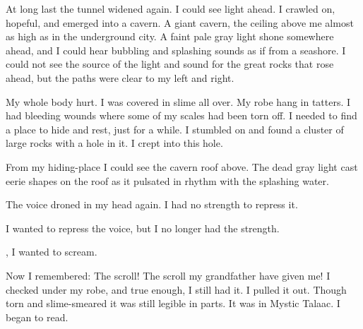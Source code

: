 \documentclass
  [a4paper,
   12pt,
   oneside
  ]%
  {article}
\begin{document}



At long last the tunnel widened again. 
I could see light ahead. 
I crawled on, hopeful, and emerged into a cavern. 
A giant cavern, the ceiling above me almost as high as in the underground city. 
A faint pale gray light shone somewhere ahead, and I could hear bubbling and splashing sounds as if from a seashore. 
I could not see the source of the light and sound for the great rocks that rose ahead, but the paths were clear to my left and right. 

My whole body hurt. 
I was covered in slime all over. 
My robe hang in tatters. 
I had bleeding wounds where some of my scales had been torn off. 
I needed to find a place to hide and rest, just for a while.
I stumbled on and found a cluster of large rocks with a hole in it.
I crept into this hole. 

From my hiding-place I could see the cavern roof above. 
The dead gray light cast eerie shapes on the roof as it pulsated in rhythm with the splashing water. 

The voice droned in my head again. 
I had no strength to repress it. 


I wanted to repress the voice, but I no longer had the strength.


, I wanted to scream. 




Now I remembered: 
The scroll! 
The scroll my grandfather have given me!
I checked under my robe, and true enough, I still had it. 
I pulled it out. 
Though torn and slime-smeared it was still legible in parts. 
It was in Mystic Talaac. 
I began to read. 
\end{document}
